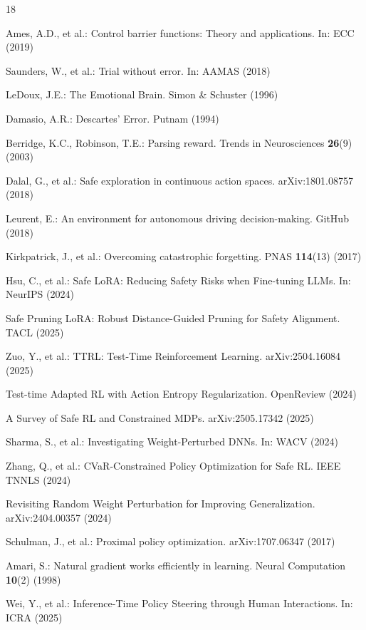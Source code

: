 \documentclass[runningheads]{llncs}
\begin{document}
\FloatBarrier
\begin{thebibliography}{18}

Ames, A.D., et al.: Control barrier functions: Theory and applications. In: ECC (2019)

Saunders, W., et al.: Trial without error. In: AAMAS (2018)

LeDoux, J.E.: The Emotional Brain. Simon \& Schuster (1996)

Damasio, A.R.: Descartes' Error. Putnam (1994)

Berridge, K.C., Robinson, T.E.: Parsing reward. Trends in Neurosciences \textbf{26}(9) (2003)

Dalal, G., et al.: Safe exploration in continuous action spaces. arXiv:1801.08757 (2018)

Leurent, E.: An environment for autonomous driving decision-making. GitHub (2018)

Kirkpatrick, J., et al.: Overcoming catastrophic forgetting. PNAS \textbf{114}(13) (2017)

Hsu, C., et al.: Safe LoRA: Reducing Safety Risks when Fine-tuning LLMs. In: NeurIPS (2024)

Safe Pruning LoRA: Robust Distance-Guided Pruning for Safety Alignment. TACL (2025)

Zuo, Y., et al.: TTRL: Test-Time Reinforcement Learning. arXiv:2504.16084 (2025)

Test-time Adapted RL with Action Entropy Regularization. OpenReview (2024)

A Survey of Safe RL and Constrained MDPs. arXiv:2505.17342 (2025)

Sharma, S., et al.: Investigating Weight-Perturbed DNNs. In: WACV (2024)

Zhang, Q., et al.: CVaR-Constrained Policy Optimization for Safe RL. IEEE TNNLS (2024)

Revisiting Random Weight Perturbation for Improving Generalization. arXiv:2404.00357 (2024)

Schulman, J., et al.: Proximal policy optimization. arXiv:1707.06347 (2017)

Amari, S.: Natural gradient works efficiently in learning. Neural Computation \textbf{10}(2) (1998)

Wei, Y., et al.: Inference-Time Policy Steering through Human Interactions. In: ICRA (2025)

\end{thebibliography}
\end{document}
